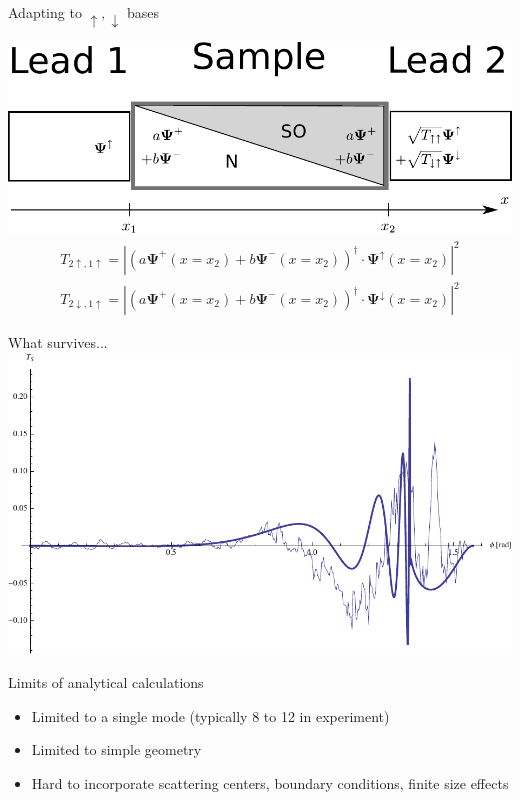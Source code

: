 \documentclass{beamer}
\begin{document}
\begin{frame}{Adapting to $\uparrow, \downarrow$ bases}
    \begin{center}
        \includegraphics[width=\textwidth]{adapting-pic.pdf}
        \begin{align*}
            T_{2\uparrow,1\uparrow} = \left| \left( 
                a \mathbf{\Psi^+}(x=x_2) + b  \mathbf{\Psi^-}(x=x_2)
            \right)^\dagger \cdot \mathbf{\Psi}^\uparrow(x=x_2) \right|^2\nonumber\\
            T_{2\downarrow,1\uparrow} = \left| \left( 
                a \mathbf{\Psi^+}(x=x_2) + b  \mathbf{\Psi^-}(x=x_2)
            \right)^\dagger \cdot \mathbf{\Psi}^\downarrow(x=x_2) \right|^2\nonumber
        \end{align*}
    \end{center}

\end{frame}

\begin{frame}{What survives...}
    \includegraphics[width=\textwidth]{comparison-over-phi.pdf}
\end{frame}

\begin{frame}{Limits of analytical calculations}

    \begin{center}
    \begin{itemize}
        \item Limited to a single mode (typically 8 to 12 in experiment)
        \item Limited to simple geometry
        \item Hard to incorporate scattering centers, boundary conditions,
            finite size effects
    \end{itemize}
    \end{center}

\end{frame}
\end{document}
